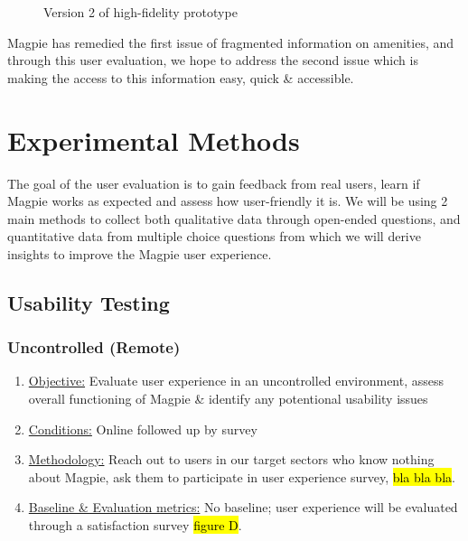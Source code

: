 \documentclass{report}
\begin{document}
\begin{figure}
\begin{minipage}{0.45\textwidth}
        \caption{Version 2 of high-fidelity prototype}
        \label{fig:plot8}
    \end{minipage}
\end{figure}

\noindent{}Magpie has remedied the first issue of fragmented information on
amenities, and through this user evaluation, we hope to address the second issue
which is making the access to this information easy, quick \& accessible.

\chapter{Experimental Methods}
The goal of the user evaluation is to gain feedback from real users, learn if
Magpie works as expected and assess how user-friendly it is. We will be using 2
main methods to collect both qualitative data through open-ended questions, and
quantitative data from multiple choice questions from which we will derive
insights to improve the Magpie user experience.
\section{Usability Testing}
\subsection{Uncontrolled (Remote)}
\begin{enumerate}
    \item \underline{Objective:} Evaluate user experience in an uncontrolled
    environment, assess overall functioning of Magpie \& identify any
    potentional usability issues
    \item \underline{Conditions:} Online followed up by survey
    \item \underline{Methodology:} Reach out to users in our target sectors who
    know nothing about Magpie, ask them to participate in user experience
    survey, \hl{bla bla bla}.
    \item \underline{Baseline \& Evaluation metrics:} No baseline; user
    experience will be evaluated through a satisfaction survey \hl{figure D}.
\end{enumerate}
\end{document}
